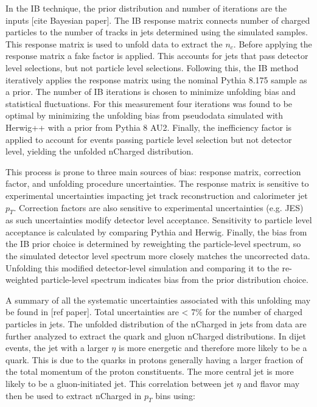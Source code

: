 In the IB technique, the prior distribution and number of iterations are the inputs [cite Bayesian paper]. The IB response matrix connects number of charged particles to the number of tracks in jets determined using the simulated samples. This response matrix is used to unfold data to extract the $n_{c}$. Before applying the response matrix a fake factor is applied. This accounts for jets that pass detector level selections, but not particle level selections. Following this, the IB method iteratively applies the response matrix using the nominal Pythia 8.175 sample as a prior. The number of IB iterations is chosen to minimize unfolding bias and statistical fluctuations. For this measurement four iterations was found to be optimal by minimizing the unfolding bias from pseudodata simulated with Herwig++ with a prior from Pythia 8 AU2. Finally, the inefficiency factor is applied to account for events passing particle level selection but not detector level, yielding the unfolded nCharged distribution.
 
This process is prone to three main sources of bias: response matrix, correction factor, and unfolding procedure uncertainties. The response matrix is sensitive to experimental uncertainties impacting jet track reconstruction and calorimeter jet $p_{T}$. Correction factors are also sensitive to experimental uncertainties (e.g. JES) as such uncertainties modify detector level acceptance. Sensitivity to particle level acceptance is calculated by comparing Pythia and Herwig. Finally, the bias from the IB prior choice is determined by reweighting the particle-level spectrum, so the simulated detector level spectrum more closely matches the uncorrected data. Unfolding this modified detector-level simulation and comparing it to the re-weighted particle-level spectrum indicates bias from the prior distribution choice.

A summary of all the systematic uncertainties associated with this unfolding may be found in [ref paper]. Total uncertainties are < 7\% for the number of charged particles in jets. The unfolded distribution of the nCharged in jets from data are further analyzed to extract the quark and gluon nCharged distributions. In dijet events, the jet with a larger $\eta$ is more energetic and therefore more likely to be a quark. This is due to the quarks in protons generally having a larger fraction of the total momentum of the proton constituents. The more central jet is more likely to be a gluon-initiated jet. This correlation between jet $\eta$ and flavor may then be used to extract nCharged in $p_{T}$ bins using:

